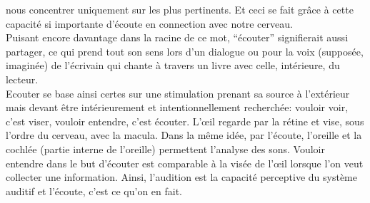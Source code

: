 nous concentrer uniquement sur les plus  pertinents. Et ceci se fait grâce à cette capacité si importante
d'écoute en connection avec notre cerveau.
\\
Puisant encore davantage dans  la racine de ce mot, ``écouter'' signifierait
aussi partager, ce qui prend tout son sens lors d'un dialogue ou
pour la voix (supposée, imaginée) de  l'écrivain qui
 chante à travers un livre avec celle, intérieure, du lecteur.
 \\
 Ecouter se base ainsi certes sur une stimulation prenant sa source à
l'extérieur mais devant être intérieurement et intentionnellement
	recherchée: vouloir voir, c'est viser, vouloir entendre, c'est
   écouter.
 L'\oe il regarde par la rétine et  vise, sous l'ordre du
  cerveau, avec la macula. Dans la même idée, par l'écoute,
  l'oreille et la cochlée (partie interne de l'oreille) permettent
  l'analyse des sons. Vouloir entendre dans le but d'écouter est comparable  à
  la visée de l'\oe il lorsque l'on veut collecter une
  information.
   Ainsi, l'audition est la capacité perceptive du système auditif et l'écoute, c'est ce qu'on en fait.


